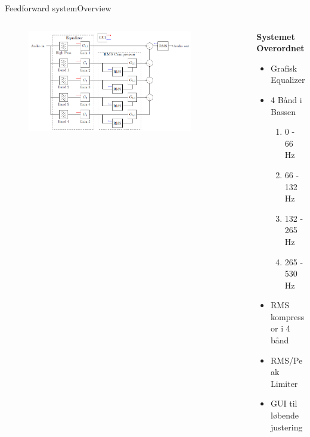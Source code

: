 \documentclass[10pt,aspectratio=169]{beamer}
\begin{document}
\begin{frame}{Feedforward system}{Overview}

\begin{columns}
  \begin{column}{0.70\textwidth}
\begin{figure}
\centering
\includegraphics[width=0.85\textwidth]{Mainsystemoverview}
\end{figure}
  \end{column}
  \begin{column}{0.30\textwidth}
  \textbf{Systemet Overordnet}
\begin{itemize}
\item Grafisk Equalizer
\item 4 Bånd i Bassen
\begin{enumerate}
\item 0   -   66 Hz
\item 66  -  132 Hz
\item 132 -  265 Hz
\item 265 -  530 Hz
\end{enumerate}
\item RMS kompressor i 4 bånd
\item RMS/Peak Limiter
\item GUI til løbende justering
\end{itemize}
  \end{column}
\end{columns}
\end{frame}
\end{document}
